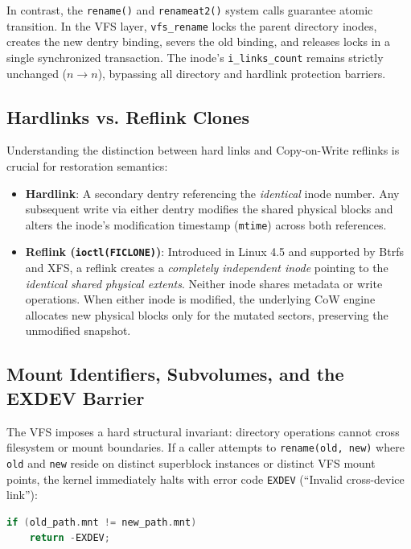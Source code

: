 \documentclass[11pt,a4paper]{article}
\begin{document}
In contrast, the \texttt{rename()} and \texttt{renameat2()} system calls guarantee atomic transition. In the VFS layer, \texttt{vfs\_rename} locks the parent directory inodes, creates the new dentry binding, severs the old binding, and releases locks in a single synchronized transaction. The inode's \texttt{i\_links\_count} remains strictly unchanged ($n \to n$), bypassing all directory and hardlink protection barriers.

\subsection{Hardlinks vs. Reflink Clones}
Understanding the distinction between hard links and Copy-on-Write reflinks is crucial for restoration semantics:
\begin{itemize}[leftmargin=1.5em]
    \item \textbf{Hardlink}: A secondary dentry referencing the \emph{identical} inode number. Any subsequent write via either dentry modifies the shared physical blocks and alters the inode's modification timestamp (\texttt{mtime}) across both references.
    \item \textbf{Reflink (\texttt{ioctl(FICLONE)})}: Introduced in Linux 4.5 and supported by Btrfs and XFS, a reflink creates a \emph{completely independent inode} pointing to the \emph{identical shared physical extents}. Neither inode shares metadata or write operations. When either inode is modified, the underlying CoW engine allocates new physical blocks only for the mutated sectors, preserving the unmodified snapshot.
\end{itemize}

\subsection{Mount Identifiers, Subvolumes, and the EXDEV Barrier}
The VFS imposes a hard structural invariant: directory operations cannot cross filesystem or mount boundaries. If a caller attempts to \texttt{rename(old, new)} where \texttt{old} and \texttt{new} reside on distinct superblock instances or distinct VFS mount points, the kernel immediately halts with error code \texttt{EXDEV} (``Invalid cross-device link''):

\begin{lstlisting}[language=C, caption={Kernel mount boundary check in \texttt{fs/namei.c}}]
if (old_path.mnt != new_path.mnt)
    return -EXDEV;
\end{lstlisting}
\end{document}
